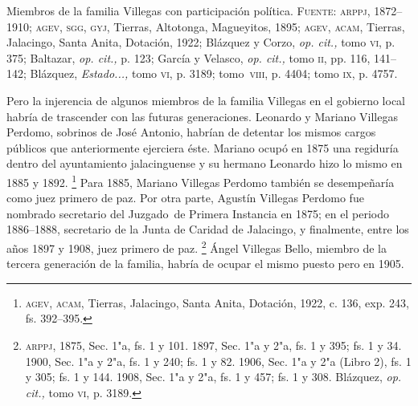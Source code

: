 \documentclass[14pt,twoside,final]{extbook} %
\let\oldfootnote\footnote
\renewcommand\footnote[1]{%
\oldfootnote{\hspace{1mm}#1}}
\begin{document}
\begin{table}
\begin{small}
\end{small}
\caption[Miembros de la familia Villegas con participación política]{Miembros de la familia Villegas con participación política. \textsc{Fuente:} \textsc{arppj}, 1872--1910; \textsc{agev, sgg, gyj}, Tierras, Altotonga, Magueyitos, 1895; \textsc{agev, acam}, Tierras, Jalacingo, Santa Anita, Dotación, 1922; Blázquez y Corzo, \emph{op. cit.,} tomo \textsc{vi}, p. 375; Baltazar, \emph{op. cit.,} p. 123; García y Velasco, \emph{op. cit.,} tomo \textsc{ii}, pp. 116, 141--142; Blázquez, \emph{Estado...,} tomo \textsc{vi}, p. 3189; tomo~\textsc{viii}, p. 4404; tomo \textsc{ix}, p. 4757.}
\label{tab:villegas-politica}
\end{table}

Pero la injerencia de algunos miembros de la familia Villegas en el gobierno local habría de trascender con las futuras generaciones. Leonardo y Mariano Villegas Perdomo, sobrinos de José Antonio, habrían de detentar los mismos cargos públicos que anteriormente ejerciera éste. Mariano ocupó en 1875 una regiduría dentro del ayuntamiento jalacinguense y su hermano Leonardo hizo lo mismo en 1885 y 1892.\footnote{\textsc{agev, acam}, Tierras, Jalacingo, Santa Anita, Dotación, 1922, c. 136, exp. 243, fs. 392--395.} Para 1885, Mariano Villegas Perdomo también se desempeñaría como juez primero de paz. Por otra parte, Agustín Villegas Perdomo fue nombrado secretario del Juzgado~de Primera Instancia en 1875; en el periodo 1886--1888, secretario de la Junta de Caridad de Jalacingo, y finalmente, entre los años 1897 y 1908, juez primero de paz.\footnote{\textsc{arppj}, 1875, Sec. 1"a, fs. 1 y 101. 1897, Sec. 1"a y 2"a, fs. 1 y 395; fs. 1 y 34. 1900, Sec. 1"a y 2"a, fs. 1 y 240; fs. 1 y 82. 1906, Sec. 1"a y 2"a (Libro 2), fs. 1 y 305; fs. 1 y 144. 1908, Sec. 1"a y 2"a, fs. 1 y 457; fs. 1 y 308. Blázquez, \emph{op. cit.,} tomo \textsc{vi}, p. 3189.} Ángel Villegas Bello, miembro de la tercera generación de la familia, habría de ocupar el mismo puesto pero en 1905.
\end{document}

